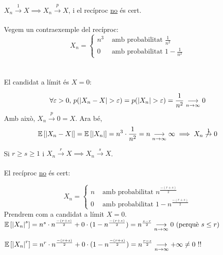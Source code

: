 \begin{prop}[(II)]
  $X_n \overset{1}{\to} X \implies X_n \overset{p}{\to} X$, i el recíproc \underline{no} és cert. \\\\
  
  Vegem un contraexemple del recíproc: \\
  
  \[
    X_n = \begin{cases}
      n^3 &\text{ amb probabilitat } \frac{1}{n^2} \\
      0   &\text{ amb probabilitat } 1 - \frac{1}{n^2}
    \end{cases}
  \]
  \-\\\\
  
  
  El candidat a límit és $X=0$:
  
  \[ 
    \forall \varepsilon > 0, \, p(\left\vert X_n - X \right\vert > \varepsilon) = p(\left\vert X_n \right\vert > \varepsilon) = \frac{1}{n^2} \underset{n\to \infty}{\longrightarrow} 0
  \]
  Amb això, $X_n \overset{p}{\to} 0 = X$. Ara bé,
  \[
    \mathbb{E}\left[\left\vert X_n - X \right\vert\right] = \mathbb{E}\left[\left\vert X_n \right\vert\right] = n^3 \cdot \frac{1}{n^2} = n \underset{n \to \infty}{\longrightarrow} \infty \implies X_n \not\overset{1}{\to} 0
  \]
\end{prop}

\begin{prop}[(III)]
  Si $r\geq s \geq 1$ i $ X_n \overset{r}{\to} X \implies X_n \overset{s}{\to} X$.\\\\
  
  El recíproc \underline{no} és cert:
  
  \[
    X_n = \begin{cases}
      n &\text{ amb probabilitat } n^{\frac{-(r+s)}{2}} \\
      0 &\text{ amb probabilitat } 1 - n^{\frac{-(r+s)}{2}}
    \end{cases} 
  \]
  Prendrem com a candidat a límit $X=0$.\\
  
  $\mathbb{E}\left[\left\vert X_n \right\vert^s \right] = n^s \cdot n^{\frac{-(r+s)}{2}} + 0\cdot (1 - n^{\frac{-(r+s)}{2}}) = n^{\frac{s-r}{2}} \underset{n \to \infty}{\longrightarrow} 0 \text{ (perquè } s \leq r)$
  
  $\mathbb{E}\left[\left\vert X_n \right\vert^r \right] = n^r \cdot n^{\frac{-(r+s)}{2}} + 0\cdot (1 - n^{\frac{-(r+s)}{2}}) = n^{\frac{r-s}{2}} \underset{n \to \infty}{\longrightarrow} +\infty \not= 0 \text{ !!}$
\end{prop}

